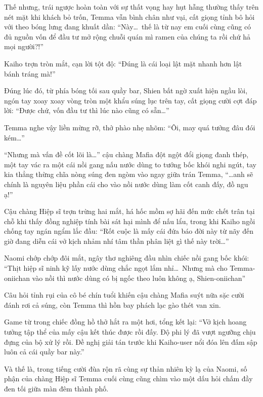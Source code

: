 \documentclass[../main.tex]{subfiles}
\begin{document}

Thế nhưng, trái ngược hoàn toàn với sự thất vọng hay hụt hẫng thường thấy trên nét mặt khi khách bỏ trốn, Temma vẫn bình chân như vại, cất giọng tỉnh bô hỏi với theo bóng lưng đang khuất dần: ``Này\dots\ thế là từ nay em cuối cùng cũng có đủ nguồn vốn để đầu tư mở rộng chuỗi quán mì ramen của chúng ta rồi chứ hả mọi người?!''

Kaiho trợn tròn mắt, cạn lời tột độ: ``Đúng là cái loại lật mặt nhanh hơn lật bánh tráng mà!''

Đúng lúc đó, từ phía bóng tối sau quầy bar, Shien bất ngờ xuất hiện ngầu lòi, ngón tay xoay xoay vòng tròn một khẩu súng lục trên tay, cất giọng cười cợt đáp lời: ``Được chứ, vốn đầu tư thì lúc nào cũng có sẵn\dots''


Temma nghe vậy liền mừng rỡ, thở phào nhẹ nhõm: ``Ôi, may quá tưởng đâu đói kém\dots''

``Nhưng mà vấn đề cốt lõi là\dots'' cậu chàng Mafia đột ngột đổi giọng đanh thép, một tay vác ra một cái nồi gang nấu nước dùng to tướng bốc khói nghi ngút, tay kia thẳng thừng chĩa nòng súng đen ngòm vào ngay giữa trán Temma, ``\dots anh sẽ chính là nguyên liệu phần cái cho vào nồi nước dùng làm cốt canh đấy, đồ ngu ạ!''


Cậu chàng Hiệp sĩ trợn trừng hai mắt, há hốc mồm sợ hãi đến mức chết trân tại chỗ khi thấy đồng nghiệp tính bài sát hại mình để nấu lẩu, trong khi Kaiho ngồi chống tay ngán ngẩm lắc đầu: ``Rốt cuộc là mấy cái đứa báo đời này từ nãy đến giờ đang diễn cái vở kịch nhảm nhí tâm thần phân liệt gì thế này trời\dots''

Naomi chớp chớp đôi mắt, ngây thơ nghiêng đầu nhìn chiếc nồi gang bốc khói: ``Thịt hiệp sĩ ninh kỹ lấy nước dùng chắc ngọt lắm nhỉ\dots\ Nhưng mà cho Temma-oniichan vào nồi thì nước dùng có bị ngốc theo luôn không ạ, Shien-oniichan''

Câu hỏi tỉnh rụi của cô bé chín tuổi khiến cậu chàng Mafia suýt nữa sặc cười đánh rơi cả súng, còn Temma thì hồn bay phách lạc gào thét van xin.

Game từ trong chiếc đồng hồ thở hắt ra một hơi, tổng kết lại: ``Vở kịch hoang tưởng tập thể của mấy cậu kết thúc được rồi đấy. Độ phi lý đã vượt ngưỡng chịu đựng của bộ xử lý rồi. Đề nghị giải tán trước khi Kaiho-user nổi đóa lên đấm sập luôn cả cái quầy bar này.''

Và thế là, trong tiếng cười đùa rộn rã cùng sự thản nhiên kỳ lạ của Naomi, số phận của chàng Hiệp sĩ Temma cuối cùng cũng chìm vào một dấu hỏi chấm đầy đen tối giữa màn đêm thành phố.
\end{document}
